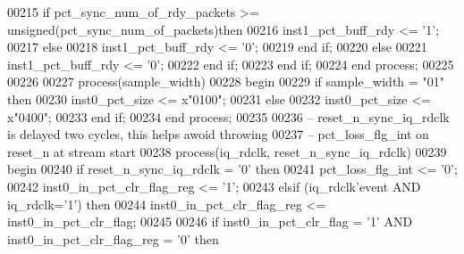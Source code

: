 \begin{DoxyCode}
00215          \textcolor{keywordflow}{if} \textcolor{vhdlchar}{pct_sync_num_of_rdy_packets} \textcolor{vhdlchar}{>=} \textcolor{comment}{unsigned}\textcolor{vhdlchar}{(}\textcolor{vhdlchar}{pct_sync_num_of_packets}\textcolor{vhdlchar}{)}\textcolor{keywordflow}{then} 
00216             inst1\_pct\_buff\_rdy <= '1';
00217          \textcolor{keywordflow}{else} 
00218             inst1\_pct\_buff\_rdy <= '0';
00219          \textcolor{keywordflow}{end} \textcolor{keywordflow}{if};
00220       \textcolor{keywordflow}{else} 
00221          inst1\_pct\_buff\_rdy <= '0';
00222       \textcolor{keywordflow}{end} \textcolor{keywordflow}{if};
00223    \textcolor{keywordflow}{end} \textcolor{keywordflow}{if};
00224 \textcolor{keywordflow}{end} \textcolor{keywordflow}{process};
00225 
00226 
00227 \textcolor{keywordflow}{process}(sample_width)
00228 \textcolor{vhdlkeyword}{begin}
00229       \textcolor{keywordflow}{if} \textcolor{vhdlchar}{sample_width} \textcolor{vhdlchar}{=} \textcolor{vhdllogic}{"01"} \textcolor{keywordflow}{then} 
00230          inst0\_pct\_size <= x"0100";
00231       \textcolor{keywordflow}{else} 
00232          inst0\_pct\_size <= x"0400";
00233       \textcolor{keywordflow}{end} \textcolor{keywordflow}{if};
00234 \textcolor{keywordflow}{end} \textcolor{keywordflow}{process};
00235 
00236 \textcolor{keyword}{-- reset\_n\_sync\_iq\_rdclk is delayed two cycles, this helps awoid throwing }
00237 \textcolor{keyword}{-- pct\_loss\_flg\_int on reset\_n at stream start }
00238  \textcolor{keywordflow}{process}(iq_rdclk, reset_n_sync_iq_rdclk)
00239 \textcolor{vhdlkeyword}{ begin}
00240    \textcolor{keywordflow}{if} \textcolor{vhdlchar}{reset_n_sync_iq_rdclk} \textcolor{vhdlchar}{=} \textcolor{vhdlchar}{'}\textcolor{vhdllogic}{}\textcolor{vhdllogic}{0}\textcolor{vhdlchar}{'} \textcolor{keywordflow}{then} 
00241       \textcolor{vhdlchar}{pct_loss_flg_int}           \textcolor{vhdlchar}{<=} \textcolor{vhdlchar}{'}\textcolor{vhdllogic}{}\textcolor{vhdllogic}{0}\textcolor{vhdlchar}{'};
00242       inst0\_in\_pct\_clr\_flag\_reg  <= '1';
00243    \textcolor{keywordflow}{elsif} \textcolor{vhdlchar}{(}\textcolor{vhdlchar}{iq_rdclk}\textcolor{vhdlchar}{'}\textcolor{vhdlkeyword}{event} \textcolor{keywordflow}{AND} \textcolor{vhdlchar}{iq_rdclk}\textcolor{vhdlchar}{=}\textcolor{vhdlchar}{'}\textcolor{vhdllogic}{}\textcolor{vhdllogic}{1}\textcolor{vhdlchar}{'}\textcolor{vhdlchar}{)} \textcolor{keywordflow}{then}
00244       inst0\_in\_pct\_clr\_flag\_reg <= inst0\_in\_pct\_clr\_flag;
00245       
00246       \textcolor{keywordflow}{if} \textcolor{vhdlchar}{inst0_in_pct_clr_flag} \textcolor{vhdlchar}{=} \textcolor{vhdlchar}{'}\textcolor{vhdllogic}{}\textcolor{vhdllogic}{1}\textcolor{vhdlchar}{'} \textcolor{keywordflow}{AND} \textcolor{vhdlchar}{inst0_in_pct_clr_flag_reg} \textcolor{vhdlchar}{=} \textcolor{vhdlchar}{'}\textcolor{vhdllogic}{}\textcolor{vhdllogic}{0}\textcolor{vhdlchar}{'} \textcolor{keywordflow}{then} 

\end{DoxyCode}
